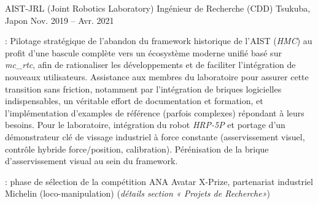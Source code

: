 \begin{cventries}
  \cventry
  {AIST-JRL (Joint Robotics Laboratory)} %
  {Ingénieur de Recherche (CDD)} %
  {Tsukuba, Japon} %
  {Nov. 2019 -- Avr. 2021} %
  {
    \begin{cvitems} %
    \item {} : Pilotage stratégique de l'abandon du
      framework historique de l'AIST (\emph{HMC}) au profit d'une bascule complète vers un écosystème moderne
      unifié basé sur \emph{mc\_rtc}, afin de rationaliser les développements et de faciliter l'intégration
      de nouveaux utilisateurs. Assistance aux membres du laboratoire pour assurer cette transition sans
      friction, notamment par l'intégration de briques logicielles indispensables, un véritable effort de
      documentation et formation, et l'implémentation d'examples de référence (parfois complexes) répondant à
      leurs besoins. Pour le laboratoire, intégration du robot \emph{HRP-5P} et portage d'un démonstrateur
      clé de vissage industriel à force constante (asservissement visuel, contrôle hybride force/position,
      calibration). Pérénisation de la brique d'asservissement visual au sein du framework.
    \item {} : phase de sélection de la compétition ANA Avatar
      X-Prize, partenariat industriel Michelin (loco-manipulation) (\emph{détails section « Projets de Recherche»})
    \end{cvitems}
  }


\end{cventries}
